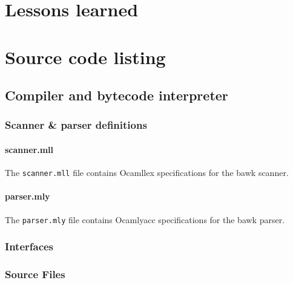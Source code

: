 \documentclass[letterpaper,11pt]{report}
\begin{document}
\chapter{Lessons learned}



\chapter{Source code listing}
\lstset{language=Caml,defaultdialect=[Objective]Caml}

\section{Compiler and bytecode interpreter}
\subsection{Scanner \& parser definitions}
\subsubsection{scanner.mll}
The \texttt{scanner.mll} file contains Ocamllex specifications for the bawk scanner.

\subsubsection{parser.mly}
The \texttt{parser.mly} file contains Ocamlyacc specifications for the bawk parser.


\subsection{Interfaces}









\subsection{Source Files}







\end{document}

